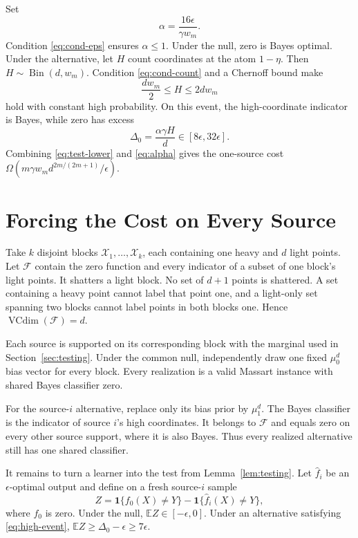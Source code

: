 \documentclass[twoside]{article}
\newcommand{\E}{\mathbb E}
\newcommand{\cF}{\mathcal F}
\newcommand{\cX}{\mathcal X}
\newcommand{\1}{\mathbf 1}
\begin{document}
Set
\begin{equation}
 \alpha=\frac{16\epsilon}{\gamma w_m}.
 \label{eq:alpha}
\end{equation}
Condition \eqref{eq:cond-eps} ensures $\alpha\le1$. Under the null, zero is Bayes optimal. Under the alternative, let $H$ count coordinates at the atom $1-\eta$. Then $H\sim\operatorname{Bin}(d,w_m)$. Condition \eqref{eq:cond-count} and a Chernoff bound make
\begin{equation}
 \frac{dw_m}{2}\le H\le2dw_m
 \label{eq:high-event}
\end{equation}
hold with constant high probability. On this event, the high-coordinate indicator is Bayes, while zero has excess
\begin{equation}
 \Delta_0=\frac{\alpha\gamma H}{d}\in[8\epsilon,32\epsilon].
 \label{eq:gap}
\end{equation}
Combining \eqref{eq:test-lower} and \eqref{eq:alpha} gives the one-source cost $\Omega(m\gamma w_m d^{2m/(2m+1)}/\epsilon)$.

\section{Forcing the Cost on Every Source}
\label{sec:lifting}

Take $k$ disjoint blocks $\cX_1,\ldots,\cX_k$, each containing one heavy and $d$ light points. Let $\cF$ contain the zero function and every indicator of a subset of one block's light points. It shatters a light block. No set of $d+1$ points is shattered. A set containing a heavy point cannot label that point one, and a light-only set spanning two blocks cannot label points in both blocks one. Hence $\operatorname{VCdim}(\cF)=d$.

Each source is supported on its corresponding block with the marginal used in Section~\ref{sec:testing}. Under the common null, independently draw one fixed $\mu_0^d$ bias vector for every block. Every realization is a valid Massart instance with shared Bayes classifier zero.

For the source-$i$ alternative, replace only its bias prior by $\mu_1^d$. The Bayes classifier is the indicator of source $i$'s high coordinates. It belongs to $\cF$ and equals zero on every other source support, where it is also Bayes. Thus every realized alternative still has one shared classifier.

It remains to turn a learner into the test from Lemma~\ref{lem:testing}. Let $\widehat f_i$ be an $\epsilon$-optimal output and define on a fresh source-$i$ sample
\begin{equation}
 Z=\1\{f_0(X)\ne Y\}-\1\{\widehat f_i(X)\ne Y\},
 \label{eq:validation-variable}
\end{equation}
where $f_0$ is zero. Under the null, $\E Z\in[-\epsilon,0]$. Under an alternative satisfying \eqref{eq:high-event}, $\E Z\ge\Delta_0-\epsilon\ge7\epsilon$.
\end{document}
